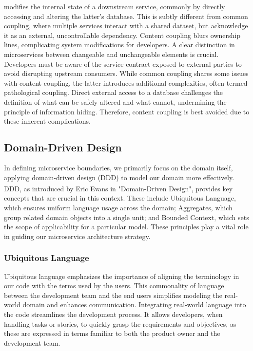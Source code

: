 \begin{itemize}
          modifies the internal state of a downstream service, commonly by directly accessing and altering
          the latter's database. This is subtly different from common coupling, where multiple services
          interact with a shared dataset, but acknowledge it as an external, uncontrollable dependency.
          Content coupling blurs ownership lines, complicating system modifications for developers. A
          clear distinction in microservices between changeable and unchangeable elements is crucial.
          Developers must be aware of the service contract exposed to external parties to avoid disrupting
          upstream consumers. While common coupling shares some issues with content coupling, the latter
          introduces additional complexities, often termed pathological coupling. Direct external access
          to a database challenges the definition of what can be safely altered and what cannot,
          undermining the principle of information hiding. Therefore, content coupling is best avoided due
          to these inherent complications.
\end{itemize}


\subsection{Domain-Driven Design}
In defining microservice boundaries, we primarily focus on the domain itself, applying domain-driven
design (DDD) to model our domain more effectively. DDD, as introduced by Eric Evans in
"Domain-Driven Design"\textsuperscript{\cite{ddd_book}}, provides key concepts that are crucial in
this context. These include Ubiquitous Language, which ensures uniform language usage across the
domain; Aggregates, which group related domain objects into a single unit; and Bounded Context,
which sets the scope of applicability for a particular model. These principles play a vital role in
guiding our microservice architecture strategy.

\subsubsection{Ubiquitous Language}
Ubiquitous language emphasizes the importance of aligning the terminology in our code with the terms
used by the users. This commonality of language between the development team and the end users
simplifies modeling the real-world domain and enhances communication. Integrating real-world
language into the code streamlines the development process. It allows developers, when handling
tasks or stories, to quickly grasp the requirements and objectives, as these are expressed in terms
familiar to both the product owner and the development team.

